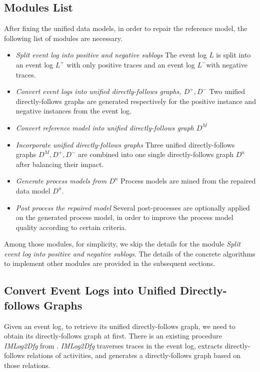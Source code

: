 \subsection{Modules List}
After fixing the unified data models, in order to repair the reference model, the following list of modules are necessary. 
\begin{itemize}
	\item \emph{Split event log into positive and negative sublogs } \quad
	The event log $L$ is split into an event log $L^+$ with only positive traces and an event log $L^-$with negative traces.
	\item \emph{Convert event logs into unified directly-follows graphs, $D^+, D^-$}\quad 
	Two unified directly-follows graphs are generated respectively for the positive instance and negative instances from the event log.
	\item \emph{Convert reference model into unified directly-follows graph $D^M$}\quad 
	\item \emph{Incorporate unified directly-follows graphs} \quad
	Three unified directly-follows  graphs $D^M, D^+, D^-$ are combined into one single directly-follows graph $D^n$ after balancing their impact.
	\item \emph{Generate process models from $D^n$} \quad
	Process models are mined from the repaired data model $D^n$.
	\item \emph{Post process the repaired model} \quad
	Several post-processes are optionally applied on the generated process model, in order to improve the process model quality according to certain criteria.
\end{itemize}
Among those modules, for simplicity, we skip the details for the module \emph{Split event log into positive and negative sublogs}. The details of the concrete algorithms to implement other modules are provided in the subsequent sections.
\subsection{Convert Event Logs into Unified Directly-follows Graphs}
Given an event log, to retrieve its unified directly-follows graph, we need to obtain its directly-follows graph at first. There is an existing procedure \emph{IMLog2Dfg} from  \cite{leemans2013discovering}. \emph{IMLog2Dfg} traverses traces in the event log, extracts directly-follows relations of activities, and generates a directly-follows graph based on those relations. 

